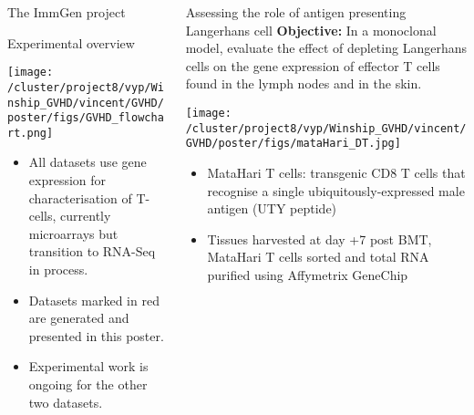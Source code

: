 \documentclass[final,hyperref={pdfpagelabels=false}]{beamer}
\begin{document}
\begin{frame}{}
\begin{columns}[t]
\begin{column}{.26\linewidth}
\begin{block}{The ImmGen project}
    \end{block}
\vspace{3cm}
\begin{block}{Experimental overview}
  \begin{center}
  \texttt{[image: /cluster/project8/vyp/Winship\_GVHD/vincent/GVHD/poster/figs/GVHD\_flowchart.png]}
  \end{center}
\end{block}
\begin{itemize}
\item All datasets use gene expression for characterisation of T-cells, currently microarrays but transition to RNA-Seq in process.
\item Datasets marked in red are generated and presented in this poster.
\item Experimental work is ongoing for the other two datasets.
\end{itemize}
  \end{column}



  \begin{column}{.36\linewidth}
    \begin{block}{Assessing the role of antigen presenting Langerhans cell}
  {\bf Objective:} In a monoclonal model, evaluate the effect of depleting Langerhans cells on the gene expression of effector T cells found in the lymph nodes and in the skin.


\begin{center}
   \texttt{[image: /cluster/project8/vyp/Winship\_GVHD/vincent/GVHD/poster/figs/mataHari\_DT.jpg]}
\end{center}
\begin{itemize}
\item MataHari T cells: transgenic CD8 T cells that recognise a single ubiquitously-expressed male antigen (UTY peptide)
\item Tissues harvested at day +7 post BMT, MataHari T cells sorted and total RNA purified using Affymetrix GeneChip
\end{itemize}
    \end{block}
    \vspace{3cm}
    

\end{column}
\end{columns}
\end{frame}
\end{document}
